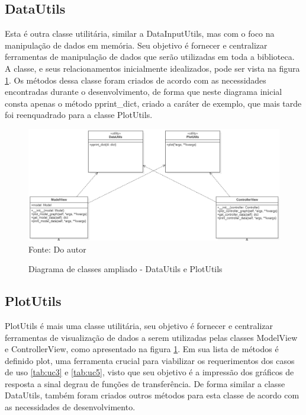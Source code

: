 \subsection{DataUtils}

Esta é outra classe utilitária, similar a DataInputUtils, mas com o foco na manipulação de dados em memória.
Seu objetivo é fornecer e centralizar ferramentas de manipulação de dados que serão utilizadas em toda a biblioteca.
A classe, e seus relacionamentos inicialmente idealizados, pode ser vista na figura \ref{fig:class_diag_dupu}.
Os métodos dessa classe foram criados de acordo com as necessidades encontradas durante o desenvolvimento, de forma que
neste diagrama inicial consta apenas o método pprint\_dict, criado a caráter de exemplo, que mais tarde foi reenquadrado
para a classe PlotUtils.

\begin{figure}[H]
    \centering
    \caption{Diagrama de classes ampliado - DataUtils e PlotUtils}
    \includegraphics[scale=0.6]{figuras/class_diag_dupu}
    \label{fig:class_diag_dupu}
    \\
    \vspace{0cm}\hspace{0cm}\small{Fonte: Do autor}
\end{figure}

\subsection{PlotUtils}

PlotUtils é mais uma classe utilitária, seu objetivo é fornecer e centralizar ferramentas de visualização de dados
a serem utilizadas pelas classes ModelView e ControllerView, como apresentado na figura \ref{fig:class_diag_dupu}.
Em sua lista de métodos é definido plot, uma ferramenta crucial para viabilizar os requerimentos dos casos de uso
\ref{tab:uc3} e \ref{tab:uc5}, visto que seu objetivo é a impressão dos gráficos de resposta a sinal degrau de funções de
transferência.
De forma similar a classe DataUtils, também foram criados outros métodos para esta classe de acordo com as necessidades de
desenvolvimento.

